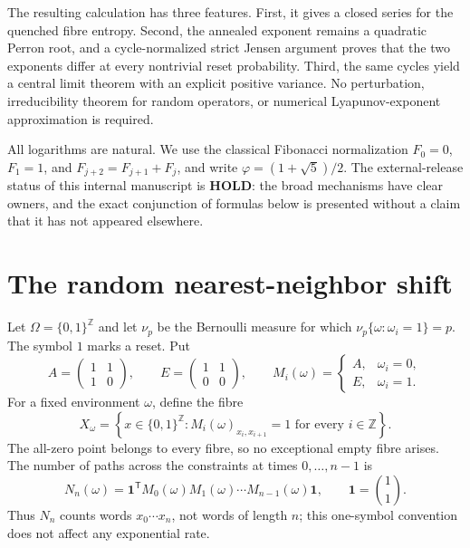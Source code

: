 \documentclass[11pt,a4paper]{amsart}
\theoremstyle{definition}
\theoremstyle{remark}
\newcommand{\Z}{\mathbb Z}
\newcommand{\one}{\mathbf 1}
\begin{document}
The resulting calculation has three features.  First, it gives a closed
series for the quenched fibre entropy.  Second, the annealed exponent remains
a quadratic Perron root, and a cycle-normalized strict Jensen argument proves
that the two exponents differ at every nontrivial reset probability.  Third,
the same cycles yield a central limit theorem with an explicit positive
variance.  No perturbation, irreducibility theorem for random operators, or
numerical Lyapunov-exponent approximation is required.

All logarithms are natural.  We use the classical Fibonacci normalization
$F_0=0$, $F_1=1$, and $F_{j+2}=F_{j+1}+F_j$, and write
$\varphi=(1+\sqrt5)/2$.  The external-release status of
this internal manuscript is \textbf{HOLD}: the broad mechanisms have clear
owners, and the exact conjunction of formulas below is presented without a
claim that it has not appeared elsewhere.

\section{The random nearest-neighbor shift}
\label{sec:model}

Let $\Omega=\{0,1\}^{\Z}$ and let $\nu_p$ be the Bernoulli measure for which
$\nu_p\{\omega:\omega_i=1\}=p$.  The symbol $1$ marks a reset.  Put
\begin{equation}\label{eq:matrices}
 A=\begin{pmatrix}1&1\\1&0\end{pmatrix},
 \qquad
 E=\begin{pmatrix}1&1\\0&0\end{pmatrix},
 \qquad
 M_i(\omega)=\begin{cases}A,&\omega_i=0,\\E,&\omega_i=1.\end{cases}
\end{equation}
For a fixed environment $\omega$, define the fibre
\begin{equation}\label{eq:fibre}
 X_\omega=\left\{x\in\{0,1\}^{\Z}:
 M_i(\omega)_{x_i,x_{i+1}}=1\text{ for every }i\in\Z\right\}.
\end{equation}
The all-zero point belongs to every fibre, so no exceptional empty fibre
arises.  The number of paths across the constraints at times
$0,\ldots,n-1$ is
\begin{equation}\label{eq:path-count}
 N_n(\omega)=\one^{\mathsf T}M_0(\omega)M_1(\omega)\cdots
 M_{n-1}(\omega)\one,
 \qquad \one=\binom11.
\end{equation}
Thus $N_n$ counts words $x_0\cdots x_n$, not words of length $n$; this
one-symbol convention does not affect any exponential rate.
\end{document}
